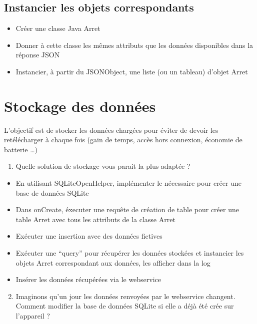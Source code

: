\documentclass{article}
\begin{document}
\subsection{Instancier les objets correspondants}
\begin{itemize} 
  \item Créer une classe Java Arret 
  \item Donner à cette classe les mêmes attributs que les données disponibles dans la réponse JSON
  \item Instancier, à partir du JSONObject, une liste (ou un tableau) d'objet
  Arret
\end{itemize}
\section{Stockage des données}
L'objectif est de stocker les données chargées pour éviter de devoir les
retélécharger à chaque fois (gain de temps, accès hors connexion, économie de
batterie \ldots)
\begin{enumerate}
 \setcounter{enumi}{0}
\item Quelle solution de stockage vous parait la plus adaptée ?
\end{enumerate}
\begin{itemize} 
  \item En utilisant SQLiteOpenHelper, implémenter le nécessaire pour créer une
  base de données SQLite
  \item Dans onCreate, éxecuter une requête de création de table pour créer
  une table Arret avec tous les attributs de la classe Arret
  \item Exécuter une insertion avec des données fictives
  \item Exécuter une ``query'' pour récupérer les données stockées et instancier
  les objets Arret correspondant aux données, les afficher dans la log
  \item Insérer les données récupérées via le webservice
\end{itemize}
\begin{enumerate}
 \setcounter{enumi}{1}
\item Imaginons qu'un jour les données renvoyées par le webservice changent.\\
Comment modifier la base de données SQLite si elle a déjà été crée sur l'appareil ?
\end{enumerate}
\end{document}
